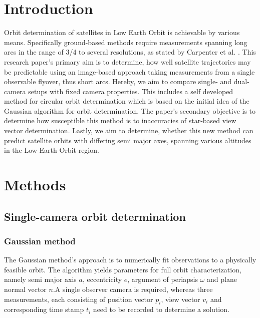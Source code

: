 \documentclass[10pt,a4paper]{article}
\begin{document}
	\section{Introduction}\label{sec:introduction}
	Orbit determination of satellites in Low Earth Orbit is achievable by various means. Specifically ground-based methods require measurements spanning long arcs in the range of 3/4 to several resolutions, as stated by Carpenter et al. \cite{semi_major_axis_knowledge}. This research paper's primary aim is to determine, how well satellite trajectories may be predictable using an image-based approach taking measurements from a single observable flyover, thus short arcs. Hereby, we aim to compare single- and dual-camera setups with fixed camera properties.\newline
	This includes a self developed method for circular orbit determination which is based on the initial idea of the Gaussian algorithm for orbit determination. The paper's secondary objective is to determine how susceptible this method is to inaccuracies of star-based view vector determination. Lastly, we aim to determine, whether this new method can predict satellite orbits with differing semi major axes, spanning various altitudes in the Low Earth Orbit region.
	
	\section{Methods}\label{sec:methods}
	\subsection{Single-camera orbit determination}\label{sec:one_camera_determination}
	\subsubsection{Gaussian method}\label{sec:gauss_method}
	The Gaussian method's approach is to numerically fit observations to a physically feasible orbit.
	The algorithm yields parameters for full orbit characterization, namely semi major axis $a$, eccentricity $e$, argument of periapsis $\omega$ and plane normal vector $n$.\newline A single observer camera is required, whereas three measurements, each consisting of position vector $p_i$, view vector $v_i$ and corresponding time stamp $t_i$ need to be recorded to determine a solution. \cite{curtis_gauss_algo}
\end{document}
